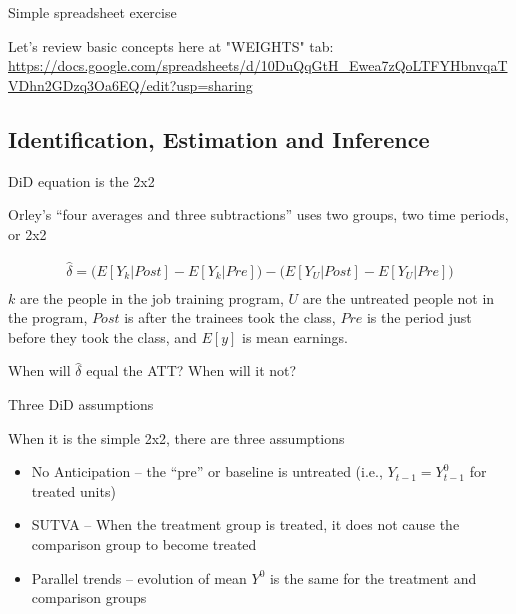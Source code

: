 \documentclass{beamer}
\begin{document}
\begin{frame}{Simple spreadsheet exercise}

Let's review basic concepts here at "WEIGHTS" tab: \url{https://docs.google.com/spreadsheets/d/10DuQqGtH_Ewea7zQoLTFYHbnvqaTVDhn2GDzq3Oa6EQ/edit?usp=sharing}

\end{frame}

\subsection{Identification, Estimation and Inference}


\begin{frame}{DiD equation is the 2x2}

Orley's ``four averages and three subtractions'' uses two groups, two time periods, or 2x2

\begin{eqnarray*}
\widehat{\delta} = \bigg ( E[Y_k|Post] - E[Y_k|Pre] \bigg ) - \bigg ( E[Y_U | Post ] - E[ Y_U | Pre] \bigg) \\
\end{eqnarray*}$k$ are the people in the job training program, $U$ are the untreated people not in the program, $Post$ is after the trainees took the class, $Pre$ is the period just before they took the class, and $E[y]$ is mean earnings. 

\bigskip

When will $\widehat{\delta}$ equal the ATT?  When will it not?

\end{frame}

\begin{frame}{Three DiD assumptions}

When it is the simple 2x2, there are three assumptions
\begin{itemize}
\item No Anticipation -- the ``pre'' or baseline is untreated (i.e., $Y_{t-1} = Y^0_{t-1}$ for treated units)
\item SUTVA -- When the treatment group is treated, it does not cause the comparison group to become treated
\item Parallel trends -- evolution of mean $Y^0$ is the same for the treatment and comparison groups
\end{itemize}

\end{frame}
\end{document}
